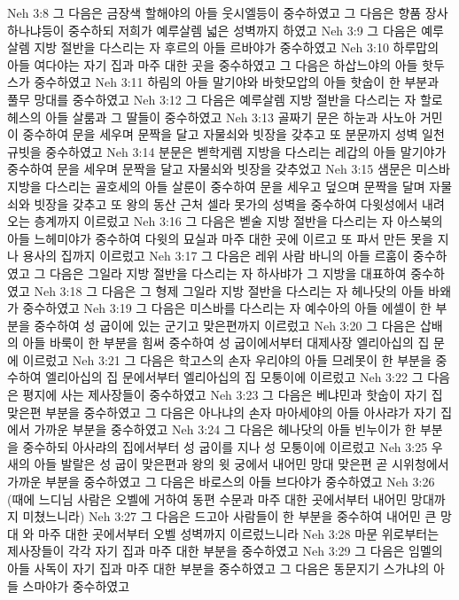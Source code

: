 Neh 3:8  그 다음은 금장색 할해야의 아들 웃시엘등이 중수하였고 그 다음은 향품 장사 하나냐등이 중수하되 저희가 예루살렘 넓은 성벽까지 하였고
Neh 3:9  그 다음은 예루살렘 지방 절반을 다스리는 자 후르의 아들 르바야가 중수하였고
Neh 3:10  하루맙의 아들 여다야는 자기 집과 마주 대한 곳을 중수하였고 그 다음은 하삽느야의 아들 핫두스가 중수하였고
Neh 3:11  하림의 아들 말기야와 바핫모압의 아들 핫숩이 한 부분과 풀무 망대를 중수하였고
Neh 3:12  그 다음은 예루살렘 지방 절반을 다스리는 자 할로헤스의 아들 살룸과 그 딸들이 중수하였고
Neh 3:13  골짜기 문은 하눈과 사노아 거민이 중수하여 문을 세우며 문짝을 달고 자물쇠와 빗장을 갖추고 또 분문까지 성벽 일천 규빗을 중수하였고
Neh 3:14  분문은 벧학게렘 지방을 다스리는 레갑의 아들 말기야가 중수하여 문을 세우며 문짝을 달고 자물쇠와 빗장을 갖추었고
Neh 3:15  샘문은 미스바 지방을 다스리는 골호세의 아들 살룬이 중수하여 문을 세우고 덮으며 문짝을 달며 자물쇠와 빗장을 갖추고 또 왕의 동산 근처 셀라 못가의 성벽을 중수하여 다윗성에서 내려오는 층계까지 이르렀고
Neh 3:16  그 다음은 벧술 지방 절반을 다스리는 자 아스북의 아들 느헤미야가 중수하여 다윗의 묘실과 마주 대한 곳에 이르고 또 파서 만든 못을 지나 용사의 집까지 이르렀고
Neh 3:17  그 다음은 레위 사람 바니의 아들 르훔이 중수하였고 그 다음은 그일라 지방 절반을 다스리는 자 하사뱌가 그 지방을 대표하여 중수하였고
Neh 3:18  그 다음은 그 형제 그일라 지방 절반을 다스리는 자 헤나닷의 아들 바왜가 중수하였고
Neh 3:19  그 다음은 미스바를 다스리는 자 예수아의 아들 에셀이 한 부분을 중수하여 성 굽이에 있는 군기고 맞은편까지 이르렀고
Neh 3:20  그 다음은 삽배의 아들 바룩이 한 부분을 힘써 중수하여 성 굽이에서부터 대제사장 엘리아십의 집 문에 이르렀고
Neh 3:21  그 다음은 학고스의 손자 우리야의 아들 므레못이 한 부분을 중수하여 엘리아십의 집 문에서부터 엘리아십의 집 모퉁이에 이르렀고
Neh 3:22  그 다음은 평지에 사는 제사장들이 중수하였고
Neh 3:23  그 다음은 베냐민과 핫숩이 자기 집 맞은편 부분을 중수하였고 그 다음은 아나냐의 손자 마아세야의 아들 아사랴가 자기 집에서 가까운 부분을 중수하였고
Neh 3:24  그 다음은 헤나닷의 아들 빈누이가 한 부분을 중수하되 아사랴의 집에서부터 성 굽이를 지나 성 모퉁이에 이르렀고
Neh 3:25  우새의 아들 발랄은 성 굽이 맞은편과 왕의 윗 궁에서 내어민 망대 맞은편 곧 시위청에서 가까운 부분을 중수하였고 그 다음은 바로스의 아들 브다야가 중수하였고
Neh 3:26  (때에 느디님 사람은 오벨에 거하여 동편 수문과 마주 대한 곳에서부터 내어민 망대까지 미쳤느니라)
Neh 3:27  그 다음은 드고아 사람들이 한 부분을 중수하여 내어민 큰 망대 와 마주 대한 곳에서부터 오벨 성벽까지 이르렀느니라
Neh 3:28  마문 위로부터는 제사장들이 각각 자기 집과 마주 대한 부분을 중수하였고
Neh 3:29  그 다음은 임멜의 아들 사독이 자기 집과 마주 대한 부분을 중수하였고 그 다음은 동문지기 스가냐의 아들 스마야가 중수하였고

